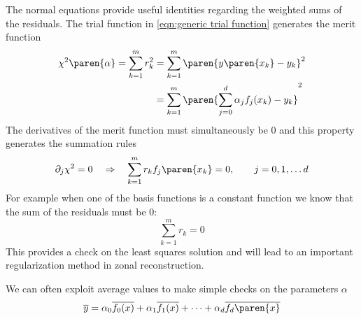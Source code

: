 The normal equations provide useful identities regarding the weighted sums of the residuals. The trial function in \eqref{eqn:generic trial function} generates the merit function
  \begin{equation}
  \begin{split}
    \chi^{2}\paren{\alpha} = \sum_{k=1}^{m}r_{k}^{2} 
      & = \sum_{k=1}^{m}\paren{y\paren{x_{k}} - y_{k}}^{2} \\
      & = \sum_{k=1}^{m}\paren{\sum_{j=0}^{d}\alpha_{j}f_{j}(x_{k}) - y_{k}}^{2}
  \end{split}
  \end{equation}
The derivatives of the merit function must simultaneously be 0 and this property generates the summation rules
  \begin{equation}
    \partial_{j}\chi^{2}=0 \quad \Rightarrow \quad \sum_{k=1}^{m}r_{k} f_{j}\paren{x_{k}} = 0, \qquad j=0,1,\dots d
  \end{equation}
For example when one of the basis functions is a constant function we know that the sum of the residuals must be 0:
  \begin{equation}
    \sum_{k=1}^{m}r_{k} = 0
  \end{equation}
This provides a check on the least squares solution and will lead to an important regularization method in zonal reconstruction.

We can often exploit average values to make simple checks on the parameters $\alpha$
  \begin{equation}
    \overline{y} = \alpha_{0} \overline{f_{0}(x)} + \alpha_{1} \overline{f_{1}(x)} + \cdots + \alpha_{d} \overline{f_{d}\paren{x}}
    \label{eqn:average}
  \end{equation}

\endinput  %
